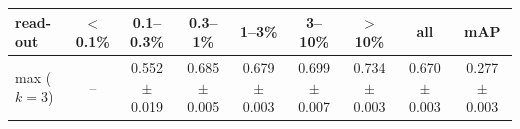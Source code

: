 \begin{tabular}{lcccccccc}
\toprule
read-out & $<$0.1\% & 0.1--0.3\% & 0.3--1\% & 1--3\% & 3--10\% & $>$10\% & all & mAP \\
\midrule
max ($k=3$) & -- & 0.552 $\pm$ 0.019 & 0.685 $\pm$ 0.005 & 0.679 $\pm$ 0.003 & 0.699 $\pm$ 0.007 & 0.734 $\pm$ 0.003 & 0.670 $\pm$ 0.003 & 0.277 $\pm$ 0.003 \\
\bottomrule
\end{tabular}
